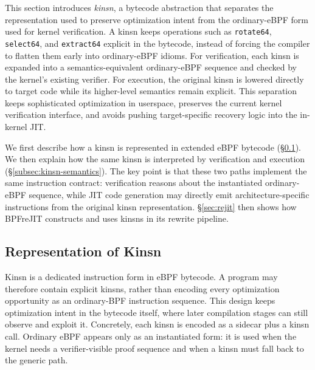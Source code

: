 This section introduces \emph{kinsn}, a bytecode abstraction that separates the representation used to preserve optimization intent from the ordinary-eBPF form used for kernel verification. A kinsn keeps operations such as \texttt{rotate64}, \texttt{select64}, and \texttt{extract64} explicit in the bytecode, instead of forcing the compiler to flatten them early into ordinary-eBPF idioms. For verification, each kinsn is expanded into a semantics-equivalent ordinary-eBPF sequence and checked by the kernel's existing verifier. For execution, the original kinsn is lowered directly to target code while its higher-level semantics remain explicit. This separation keeps sophisticated optimization in userspace, preserves the current kernel verification interface, and avoids pushing target-specific recovery logic into the in-kernel JIT.

We first describe how a kinsn is represented in extended eBPF bytecode (§\ref{subsec:kinsn-repr}). We then explain how the same kinsn is interpreted by verification and execution (§\ref{subsec:kinsn-semantics}). The key point is that these two paths implement the same instruction contract: verification reasons about the instantiated ordinary-eBPF sequence, while JIT code generation may directly emit architecture-specific instructions from the original kinsn representation. §\ref{sec:rejit} then shows how BPFreJIT constructs and uses kinsns in its rewrite pipeline.



\subsection{Representation of Kinsn}
\label{subsec:kinsn-repr}

Kinsn is a dedicated instruction form in eBPF bytecode. A program may therefore contain explicit kinsns, rather than encoding every optimization opportunity as an ordinary-BPF instruction sequence. This design keeps optimization intent in the bytecode itself, where later compilation stages can still observe and exploit it. Concretely, each kinsn is encoded as a sidecar plus a kinsn call. Ordinary eBPF appears only as an instantiated form: it is used when the kernel needs a verifier-visible proof sequence and when a kinsn must fall back to the generic path.




